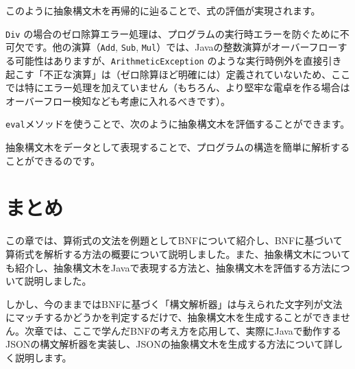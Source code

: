 このように抽象構文木を再帰的に辿ることで、式の評価が実現されます。

\texttt{Div}
の場合のゼロ除算エラー処理は、プログラムの実行時エラーを防ぐために不可欠です。他の演算（\texttt{Add},
\texttt{Sub},
\texttt{Mul}）では、Javaの整数演算がオーバーフローする可能性はありますが、\texttt{ArithmeticException}
のような実行時例外を直接引き起こす「不正な演算」は（ゼロ除算ほど明確には）定義されていないため、ここでは特にエラー処理を加えていません（もちろん、より堅牢な電卓を作る場合はオーバーフロー検知なども考慮に入れるべきです）。

\texttt{eval}メソッドを使うことで、次のように抽象構文木を評価することができます。

\begin{Shaded}
\begin{Highlighting}[]
 \NormalTok{(}
   \NormalTok{(}\NormalTok{), } \NormalTok{(} \NormalTok{(}\NormalTok{), } \NormalTok{(}\NormalTok{))}
\NormalTok{);}
\end{Highlighting}
\end{Shaded}

抽象構文木をデータとして表現することで、プログラムの構造を簡単に解析することができるのです。

\hypertarget{chapter2-ux307eux3068ux3081}{%
\section{まとめ}\label{chapter2-ux307eux3068ux3081}}

この章では、算術式の文法を例題としてBNFについて紹介し、BNFに基づいて算術式を解析する方法の概要について説明しました。また、抽象構文木についても紹介し、抽象構文木をJavaで表現する方法と、抽象構文木を評価する方法について説明しました。

しかし、今のままではBNFに基づく「構文解析器」は与えられた文字列が文法にマッチするかどうかを判定するだけで、抽象構文木を生成することができません。次章では、ここで学んだBNFの考え方を応用して、実際にJavaで動作するJSONの構文解析器を実装し、JSONの抽象構文木を生成する方法について詳しく説明します。
